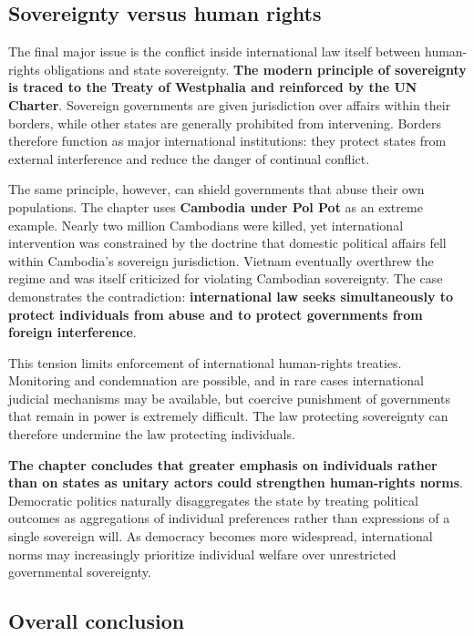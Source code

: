 \subsection{Sovereignty versus human rights}

The final major issue is the conflict inside international law itself between human-rights obligations and state sovereignty. \textbf{The modern principle of sovereignty is traced to the Treaty of Westphalia and reinforced by the UN Charter}. Sovereign governments are given jurisdiction over affairs within their borders, while other states are generally prohibited from intervening. Borders therefore function as major international institutions: they protect states from external interference and reduce the danger of continual conflict.

The same principle, however, can shield governments that abuse their own populations. The chapter uses \textbf{Cambodia under Pol Pot} as an extreme example. Nearly two million Cambodians were killed, yet international intervention was constrained by the doctrine that domestic political affairs fell within Cambodia's sovereign jurisdiction. Vietnam eventually overthrew the regime and was itself criticized for violating Cambodian sovereignty. The case demonstrates the contradiction: \textbf{international law seeks simultaneously to protect individuals from abuse and to protect governments from foreign interference}.

This tension limits enforcement of international human-rights treaties. Monitoring and condemnation are possible, and in rare cases international judicial mechanisms may be available, but coercive punishment of governments that remain in power is extremely difficult. The law protecting sovereignty can therefore undermine the law protecting individuals.

\textbf{The chapter concludes that greater emphasis on individuals rather than on states as unitary actors could strengthen human-rights norms}. Democratic politics naturally disaggregates the state by treating political outcomes as aggregations of individual preferences rather than expressions of a single sovereign will. As democracy becomes more widespread, international norms may increasingly prioritize individual welfare over unrestricted governmental sovereignty.

\subsection{Overall conclusion}

